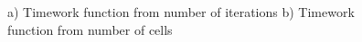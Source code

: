 \begin{figure}[h]\label{TimeERROR}
\begin{minipage}[h]{0.49\linewidth}
\end{minipage}
\hfill
\begin{minipage}[h]{0.49\linewidth}
\end{minipage}
\caption{a) Timework function from number of iterations b) Timework function from
number of cells}
\end{figure}
